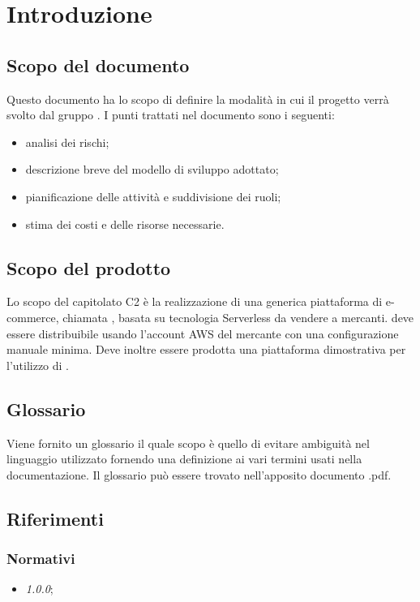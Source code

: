 \section{Introduzione}
\subsection{Scopo del documento}
Questo documento ha lo scopo di definire la modalità in cui il progetto \nameproject{} verrà svolto dal gruppo \Omicron{}. I punti trattati nel documento sono i seguenti:
\begin{itemize}
\item analisi dei rischi;
\item descrizione breve del modello di sviluppo adottato;
\item pianificazione delle attività e suddivisione dei ruoli;
\item stima dei costi e delle risorse necessarie.
\end{itemize}
\subsection{Scopo del prodotto}
Lo scopo del capitolato C2 è la realizzazione di una generica piattaforma di e-commerce, chiamata \nameproject{}, basata su tecnologia Serverless da vendere a mercanti. \nameproject{} deve essere distribuibile usando l'account AWS del mercante con una configurazione manuale minima. Deve inoltre essere prodotta una piattaforma dimostrativa per l'utilizzo di \nameproject{}.
\subsection{Glossario}
Viene fornito un glossario il quale scopo è quello di evitare ambiguità nel linguaggio utilizzato fornendo una definizione ai vari termini usati nella documentazione. Il glossario può essere trovato nell'apposito documento \Glossario{}.pdf.
\subsection{Riferimenti}
\subsubsection{Normativi}
\begin{itemize}
\item \textit{\NdP{} 1.0.0};
\end{itemize}

